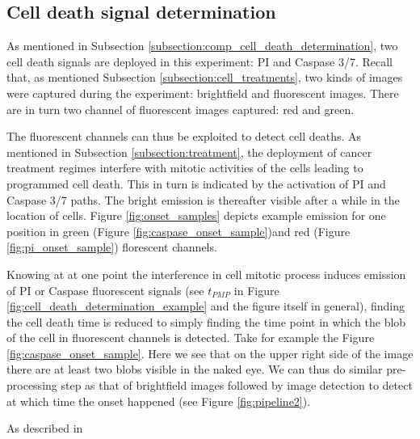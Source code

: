 \documentclass[pdftex,12pt,a4paper]{report}
\begin{document}
\subsection{Cell death signal determination}

As mentioned in Subsection \ref{subsection:comp_cell_death_determination}, two cell death signals are deployed in this experiment: PI and Caspase 3/7. Recall that, as mentioned Subsection \ref{subsection:cell_treatments}, two kinds of images were captured during the experiment: brightfield and fluorescent images. There are in turn two channel of fluorescent images captured: red and green.

The fluorescent channels can thus be exploited to detect cell deaths. As mentioned in Subsection \ref{subsection:treatment}, the deployment of cancer treatment regimes interfere with mitotic activities of the cells leading to programmed cell death. This in turn is indicated by the activation of PI and Caspase 3/7 paths. The bright emission is thereafter visible after a while in the location of cells. Figure \ref{fig:onset_samples} depicts example emission for one position in green (Figure \ref{fig:caspase_onset_sample})and red (Figure \ref{fig:pi_onset_sample}) florescent channels.

Knowing at at one point the interference in cell mitotic process induces emission of PI or Caspase fluorescent signals (see $t_{PMP}$ in Figure \ref{fig:cell_death_determination_example} and the figure itself in general), finding the cell death time is reduced to simply finding the time point in which the blob of the cell in fluorescent channels is detected. Take for example the Figure \ref{fig:caspase_onset_sample}. Here we see that on the upper right side of the image there are at least two blobs visible in the naked eye. We can thus do similar pre-processing step as that of brightfield images followed by image detection to detect at which time the onset happened (see Figure \ref{fig:pipeline2}).


As described in 
\end{document}
